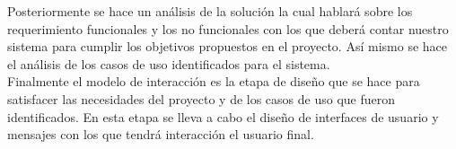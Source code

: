 Posteriormente se hace un análisis de la solución la cual hablará sobre los requerimiento funcionales y los no funcionales con los que deberá contar nuestro sistema para cumplir los objetivos propuestos en el proyecto. Así mismo se hace el análisis de los casos de uso identificados para el sistema. \\

Finalmente el modelo de interacción es la etapa de diseño que se hace para satisfacer las necesidades del proyecto y de los casos de uso que fueron identificados. En esta etapa se lleva a cabo el diseño de interfaces de usuario y mensajes con los que tendrá interacción el usuario final.
%
%
%
%	
%	
%
%	
%
%
%	
